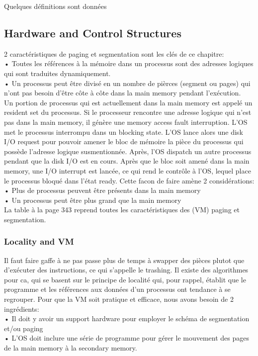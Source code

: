 Quelques définitions sont données \cite[p.~341]{stallings}
\subsection{Hardware and Control Structures}
2 caractéristiques de paging et segmentation sont les clés de ce chapitre: \\
• Toutes les références à la mémoire dans un processus sont des adresses logiques qui sont traduites dynamiquement.\\
• Un processus peut être divisé en un nombre de pièrces (segment ou pages) qui n'ont pas besoin d'être côte à côte dans la main memory pendant l'exécution.\\
Un portion de processus qui est actuellement dans la main memory est appelé un resident set du processus. Si le processeur rencontre une adresse logique qui n'est pas dans la main memory, il génère une memory access fault interruption. L'OS met le processus interrompu dans un blocking state. L'OS lance alors une disk I/O request pour pouvoir amener le bloc de mémoire la pièce du processus qui possède l'adresse logique susmentionnée. Après, l'OS dispatch un autre processus pendant que la disk I/O est en cours. Après que le bloc soit amené dans la main memory, une I/O interrupt est lancée, ce qui rend le contrôle à l'OS, lequel place le processus bloqué dans l'état ready.
Cette facon de faire amène 2 considérations:\\
• Plus de processus peuvent être présents dans la main memory \\
• Un processus peut être plus grand que la main memory\\
La table à la page 343 reprend toutes les caractéristiques des (VM) paging et segmentation.
\subsubsection{Locality and VM}
Il faut faire gaffe à ne pas passe plus de temps à swapper des pièces plutot que d'exécuter des instructions, ce qui s'appelle le trashing. Il existe des algorithmes pour ca, qui se basent sur le principe de localité qui, pour rappel, établit que le programme et les références aux données d'un processus ont tendance à se regrouper. Pour que la VM soit pratique et efficace, nous avons besoin de 2 ingrédients:\\
• Il doit y avoir un support hardware pour employer le schéma de segmentation et/ou paging\\
• L'OS doit inclure une série de programme pour gérer le mouvement des pages de la main memory à la secondary memory.\\
